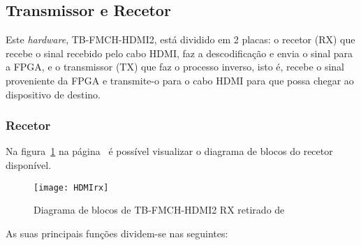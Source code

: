 \subsection{Transmissor e Recetor} \label{batik}
Este \textit{hardware}, TB-FMCH-HDMI2, está dividido em 2 placas: o recetor (RX) que recebe o sinal recebido pelo cabo HDMI, faz a descodificação e envia o sinal para a FPGA, e o transmissor (TX) que faz o processo inverso, isto é, recebe o sinal proveniente da FPGA e transmite-o para o cabo HDMI para que possa chegar ao dispositivo de destino. 
\subsubsection{Recetor}\label{batik}
Na figura~\ref{fig:HDMIblocosRX} na página~\pageref{fig:HDMIblocosRX} é possível visualizar o diagrama de blocos do recetor disponível.
\begin{figure}[h!]
	\begin{center}
		\leavevmode
		\texttt{[image: HDMIrx]}
		\caption{Diagrama de blocos de TB-FMCH-HDMI2 RX retirado de \cite{R009}}
		\label{fig:HDMIblocosRX}
	\end{center}
\end{figure}
As suas principais funções dividem-se nas seguintes:
